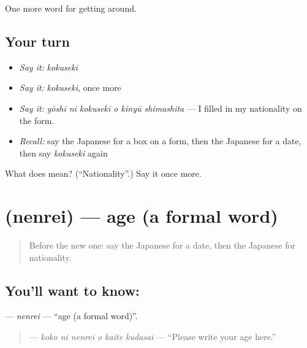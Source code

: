 \begin{grammarlens}[title={What you've built}]
One more word for getting around.
\end{grammarlens}

\subsection*{Your turn}
\begin{itemize}
\raggedright
  \item \emph{Say it:} \emph{kokuseki}
  \item \emph{Say it:} \emph{kokuseki}, once more
  \item \emph{Say it:} \emph{yōshi ni kokuseki o kinyū shimashita} — I filled in my nationality on the form.
  \item \emph{Recall:} say the Japanese for a box on a form, then the Japanese for a date, then say \emph{kokuseki} again
\end{itemize}

\begin{tcolorbox}[breakable,colback=teal!4,colframe=teal!35!black,title={Before you move on}]
What does  mean? (\textquotedblleft{}Nationality\textquotedblright{}.) Say it once more.
\end{tcolorbox}
\section[\texorpdfstring{\ja{ねんれい} (nenrei)}{ねんれい (nenrei)}]{ (nenrei) — age (a formal word)}

\label{lesson:JA-C419-nenrei}



\begin{quote}
Before the new one: say the Japanese for a date, then the Japanese for nationality.
\end{quote}

\subsection*{You'll want to know: }
\textbf{} — \emph{nenrei} — \textquotedblleft{}age (a formal word)\textquotedblright{}.

\begin{quote}
\textbf{   } — \emph{koko ni nenrei o kaite kudasai} — \textquotedblleft{}Please write your age here.\textquotedblright{}
\end{quote}

